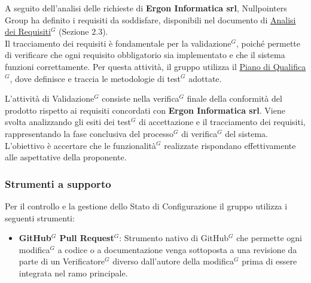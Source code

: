 A seguito dell'analisi delle richieste di \textbf{Ergon Informatica srl}, Nullpointers Group ha definito i requisiti da soddisfare, disponibili nel documento di \href{https://nullpointersgroup.github.io/Documentazione/output/PB/Documenti\%20Esterni/Analisi_dei_Requisiti.pdf}{Analisi dei Requisiti$^G$} (Sezione 2.3).\\
Il tracciamento dei requisiti è fondamentale per la validazione$^G$, poiché permette di verificare che ogni requisito obbligatorio sia implementato e che il sistema funzioni correttamente. Per questa attività, il gruppo utilizza il \href{https://nullpointersgroup.github.io/Documentazione/output/PB/Documenti\%20Esterni/Piano_di_Qualifica.pdf}{Piano di Qualifica$^G$}, dove definisce e traccia le metodologie di test$^G$ adottate.

L'attività di Validazione$^G$ consiste nella verifica$^G$ finale della conformità del prodotto rispetto ai requisiti concordati con \textbf{Ergon Informatica srl}. Viene svolta analizzando gli esiti dei test$^G$ di accettazione e il tracciamento dei requisiti, rappresentando la fase conclusiva del processo$^G$ di verifica$^G$ del sistema.\\
L'obiettivo è accertare che le funzionalità$^G$ realizzate rispondano effettivamente alle aspettative della proponente.

\subsubsection{Strumenti a supporto}
    Per il controllo e la gestione dello Stato di Configurazione il gruppo utilizza i seguenti strumenti:
	\begin{itemize}[itemsep=3pt, parsep=1pt, label=$\scriptstyle\bullet$]
	    \item \textbf{GitHub$^G$ Pull Request$^G$}: Strumento nativo di GitHub$^G$ che permette ogni modifica$^G$ a codice o a documentazione venga sottoposta a una revisione da parte di un 
        Verificatore$^G$ diverso dall'autore della modifica$^G$ prima di essere integrata nel ramo principale.
	\end{itemize}
